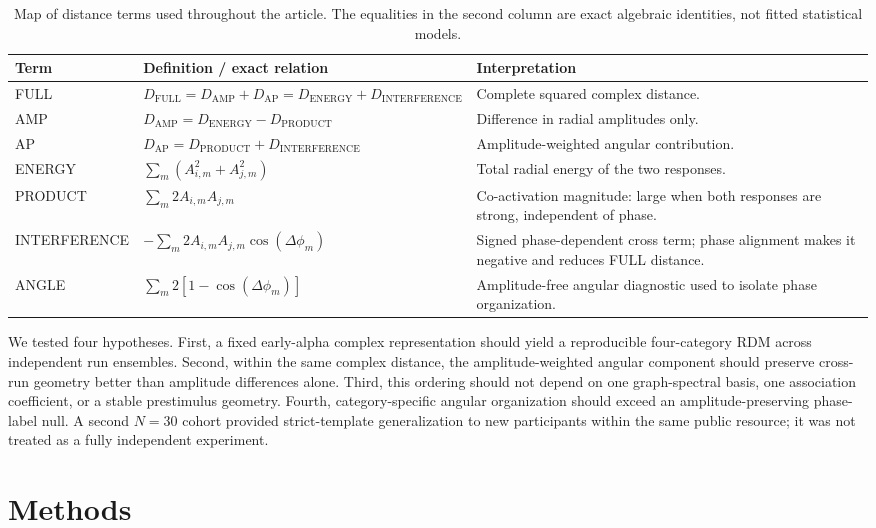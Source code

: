 \documentclass[11pt]{article}
\begin{document}
\begin{table}[ht]
\centering
\small
\caption{Map of distance terms used throughout the article. The equalities in the second column are exact algebraic identities, not fitted statistical models.}
\label{tab:terms}
\begin{tabularx}{\linewidth}{l X X}
\toprule
Term & Definition / exact relation & Interpretation \\
\midrule
FULL & $D_{\mathrm{FULL}}=D_{\mathrm{AMP}}+D_{\mathrm{AP}}=D_{\mathrm{ENERGY}}+D_{\mathrm{INTERFERENCE}}$ & Complete squared complex distance.\\
AMP & $D_{\mathrm{AMP}}=D_{\mathrm{ENERGY}}-D_{\mathrm{PRODUCT}}$ & Difference in radial amplitudes only.\\
AP & $D_{\mathrm{AP}}=D_{\mathrm{PRODUCT}}+D_{\mathrm{INTERFERENCE}}$ & Amplitude-weighted angular contribution.\\
ENERGY & $\sum_m(A_{i,m}^2+A_{j,m}^2)$ & Total radial energy of the two responses.\\
PRODUCT & $\sum_m2A_{i,m}A_{j,m}$ & Co-activation magnitude: large when both responses are strong, independent of phase.\\
INTERFERENCE & $-\sum_m2A_{i,m}A_{j,m}\cos(\Delta\phi_m)$ & Signed phase-dependent cross term; phase alignment makes it negative and reduces FULL distance.\\
ANGLE & $\sum_m2[1-\cos(\Delta\phi_m)]$ & Amplitude-free angular diagnostic used to isolate phase organization.\\
\bottomrule
\end{tabularx}
\end{table}

We tested four hypotheses. First, a fixed early-alpha complex representation should yield a reproducible four-category RDM across independent run ensembles. Second, within the same complex distance, the amplitude-weighted angular component should preserve cross-run geometry better than amplitude differences alone. Third, this ordering should not depend on one graph-spectral basis, one association coefficient, or a stable prestimulus geometry. Fourth, category-specific angular organization should exceed an amplitude-preserving phase-label null. A second $N=30$ cohort provided strict-template generalization to new participants within the same public resource; it was not treated as a fully independent experiment.

\section{Methods}
\end{document}
